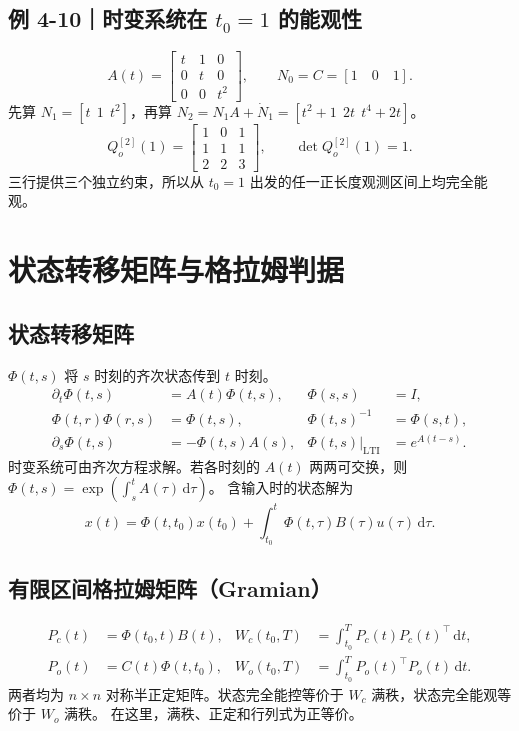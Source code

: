 \documentclass[UTF8,a4paper,12pt,fontset=fandol]{ctexart}
\newcommand{\dd}{\,\mathrm{d}}
\begin{document}
\subsection*{例 4-10｜时变系统在 $t_0=1$ 的能观性}
\[
 A(t)=\begin{bmatrix}t&1&0\\0&t&0\\0&0&t^2\end{bmatrix},
 \qquad N_0=C=[1\quad 0\quad 1].
\]
先算 $N_1=[t\ \ 1\ \ t^2]$，再算 $N_2=N_1 A+\dot N_1=[t^2+1\ \ 2t\ \ t^4+2t]$。
\[
   Q_o^{[2]}(1)=\begin{bmatrix}1&0&1\\1&1&1\\2&2&3\end{bmatrix},
   \qquad \det Q_o^{[2]}(1)=1 .
\]
三行提供三个独立约束，所以从 $t_0=1$ 出发的任一正长度观测区间上均完全能观。

\newpage
\section{状态转移矩阵与格拉姆判据}\label{sec:gram}

\subsection*{状态转移矩阵}
$\Phi(t,s)$ 将 $s$ 时刻的齐次状态传到 $t$ 时刻。
\[
\begin{aligned}
  \partial_t\Phi(t,s)&=A(t)\Phi(t,s), & \Phi(s,s)&=I,\\
  \Phi(t,r)\Phi(r,s)&=\Phi(t,s), & \Phi(t,s)^{-1}&=\Phi(s,t),\\
  \partial_s\Phi(t,s)&=-\Phi(t,s)A(s), &
  \Phi(t,s)\big|_{\mathrm{LTI}}&=e^{A(t-s)} .
\end{aligned}
\]
时变系统可由齐次方程求解。若各时刻的 $A(t)$ 两两可交换，则 $\Phi(t,s)=\exp(\int_s^t A(\tau)\dd\tau)$。
含输入时的状态解为
\[
   x(t)=\Phi(t,t_0)x(t_0)+\int_{t_0}^{t}\Phi(t,\tau)B(\tau)u(\tau)\dd\tau .
\]

\subsection*{有限区间格拉姆矩阵（Gramian）}
\begin{keybox}
\[
\begin{aligned}
 P_c(t)&=\Phi(t_0,t)B(t), &
 W_c(t_0,T)&=\int_{t_0}^{T}P_c(t)P_c(t)^\top\dd t, \\
 P_o(t)&=C(t)\Phi(t,t_0), &
 W_o(t_0,T)&=\int_{t_0}^{T}P_o(t)^\top P_o(t)\dd t.
\end{aligned}
\]
两者均为 $n\times n$ 对称半正定矩阵。状态完全能控等价于 $W_c$ 满秩，状态完全能观等价于 $W_o$ 满秩。
在这里，满秩、正定和行列式为正等价。
\end{keybox}
\end{document}
